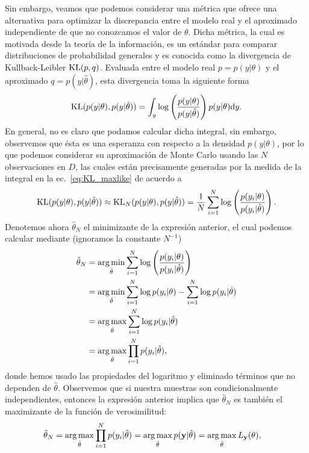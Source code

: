 Sin embargo, veamos que podemos considerar una métrica que ofrece una alternativa para optimizar la discrepancia entre el modelo real y el aproximado independiente de que no conozcamos el valor de $\theta$. Dicha métrica, la cual es motivada desde la teoría de la información, es un estándar para comparar distribuciones de probabilidad generales y es conocida como la divergencia de Kullback-Leibler $\operatorname{\text{KL}}(p,q) $. Evaluada entre el modelo real $p =  p(y|\theta)$ y el aproximado $q  = p(y|\hat\theta)$, esta divergencia toma la siguiente forma 
\begin{equation}
 	\operatorname{\text{KL}}( p(y|\theta),p(y|\hat\theta)) =  \int_y\log\left(\frac{p(y|\theta)}{p(y|\hat\theta)}\right)p(y|\theta){\text d} y.\label{eq:KL_maxlike}
 \end{equation} 
 En general, no es claro que podamos calcular dicha integral, sin embargo, observemos que ésta es una  esperanza con respecto a la densidad $p(y|\theta)$, por lo que podemos considerar su aproximación de Monte Carlo usando las $N$ observaciones en $D$, las cuales están precisamente generadas por la medida de la integral en la ec.~\eqref{eq:KL_maxlike} de acuerdo a 
\begin{equation}
	\operatorname{\text{KL}}( p(y|\theta),p(y|\hat\theta)) 	\approx \operatorname{\text{KL}}_N( p(y|\theta),p(y|\hat\theta)) = \frac{1}{N}\sum_{i=1}^N\log\left(\frac{p(y_i|\theta)}{p(y_i|\hat\theta)}\right).
\end{equation}
 Denotemos ahora $\hat\theta_N$ el minimizante de la  expresión anterior, el cual podemos calcular mediante (ignoramos la constante $N^{-1}$)
 \begin{align}
 	\hat\theta_N & =  \operatorname*{arg\,min}_{\hat\theta}  \sum_{i=1}^N\log\left(\frac{p(y_i|\theta)}{p(y_i|\hat\theta)}\right)\\
 				&= \operatorname*{arg\,min}_{\hat\theta}  \sum_{i=1}^N  \log p(y_i|\theta) - \sum_{i=1}^N \log p(y_i|\hat\theta)\nonumber\\
 				&= \operatorname*{arg\,max}_{\hat\theta}  \sum_{i=1}^N \log p(y_i|\hat\theta)\nonumber\\
 				&= \operatorname*{arg\,max}_{\hat\theta}  \prod_{i=1}^N p(y_i|\hat\theta),\nonumber
 \end{align}
 donde hemos usado las propiedades del logaritmo y eliminado términos que no dependen de $\hat\theta$. Observemos que si nuestra muestras son condicionalmente independientes, entonces la expresión anterior implica que $\hat\theta_N$ es también el maximizante de la función de verosimilitud:
 \begin{align}
 	\hat\theta_N &= \operatorname*{arg\,max}_{\hat\theta}  \prod_{i=1}^N p(y_i|\hat\theta) = \operatorname*{arg\,max}_{\hat\theta}  p(\mathbf{y}|\hat\theta) = \operatorname*{arg\,max}_{\hat\theta}  L_{\mathbf{y}}(\theta),
 \end{align}
